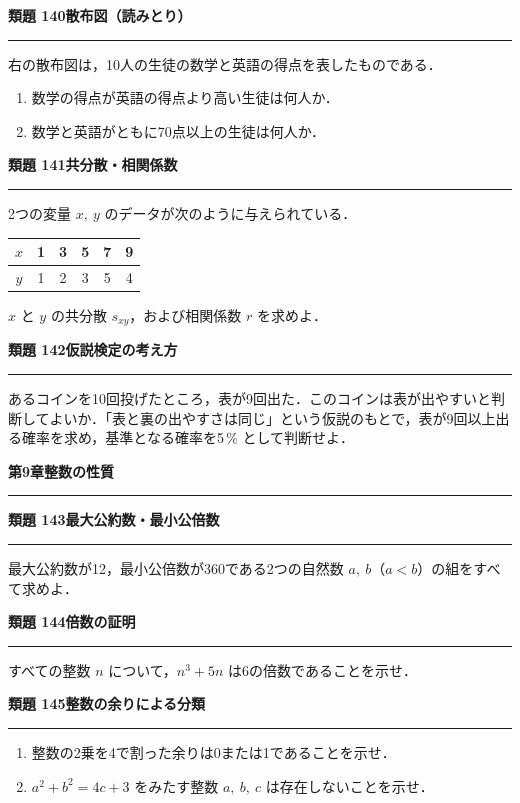 \documentclass[a4paper,11pt]{ltjsarticle}
\newcommand{\mon}[2]{\Needspace{7\baselineskip}\vspace{10pt}%
  {\sffamily\bfseries 類題 #1\quad #2\par}\vspace{2pt}\hrule\vspace{4pt}}
\newcommand{\shou}[2]{\clearpage\markboth{#1\quad #2}{}%
  {\sffamily\bfseries\LARGE #1\quad #2\par}\vspace{2pt}\hrule height 1.2pt\vspace{4pt}}
\begin{document}
\mon{140}{散布図（読みとり）}
\begin{minipage}[t]{0.55\linewidth}
右の散布図は，10人の生徒の数学と英語の得点を表したものである．
\begin{enumerate}
\item 数学の得点が英語の得点より高い生徒は何人か．
\item 数学と英語がともに70点以上の生徒は何人か．
\end{enumerate}
\end{minipage}\hfill
\begin{minipage}[t]{0.42\linewidth}
\vspace{-4pt}
\end{minipage}

\mon{141}{共分散・相関係数}
2つの変量 $x,\ y$ のデータが次のように与えられている．
\begin{center}
\begin{tabular}{c|ccccc}
$x$ & 1 & 3 & 5 & 7 & 9\\ \hline
$y$ & 1 & 2 & 3 & 5 & 4
\end{tabular}
\end{center}
$x$ と $y$ の共分散 $s_{xy}$，および相関係数 $r$ を求めよ．

\mon{142}{仮説検定の考え方}
あるコインを10回投げたところ，表が9回出た．このコインは表が出やすいと判断してよいか．「表と裏の出やすさは同じ」という仮説のもとで，表が9回以上出る確率を求め，基準となる確率を5\,\% として判断せよ．

\shou{第9章}{整数の性質}
\mon{143}{最大公約数・最小公倍数}
最大公約数が12，最小公倍数が360である2つの自然数 $a,\ b$（$a<b$）の組をすべて求めよ．

\mon{144}{倍数の証明}
すべての整数 $n$ について，$n^3+5n$ は6の倍数であることを示せ．

\mon{145}{整数の余りによる分類}
\begin{enumerate}
\item 整数の2乗を4で割った余りは0または1であることを示せ．
\item $a^2+b^2=4c+3$ をみたす整数 $a,\ b,\ c$ は存在しないことを示せ．
\end{enumerate}
\end{document}
